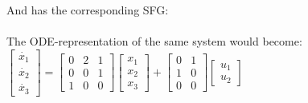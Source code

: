And has the corresponding SFG:\\\newline
\setlength\fboxsep{0pt}
\setlength\fboxrule{0.5pt}
\\\newline The ODE-representation of the same system would become:\\\newline
$\left[ \begin{array}{c} \dot{x_1} \\ \dot{x_2} \\ \dot{x_3} \end{array} \right]
= \begin{bmatrix} 0 & 2 & 1 \\ 0 & 0 & 1 \\ 1 & 0 & 0 \end{bmatrix} \left[ \begin{array}{c} x_1 \\ x_2 \\ x_3 \end{array} \right] + \begin{bmatrix} 0 & 1 \\ 1 & 0 \\ 0 & 0 \end{bmatrix}  \left[ \begin{array}{c} u_1 \\ u_2 \end{array} \right]$
